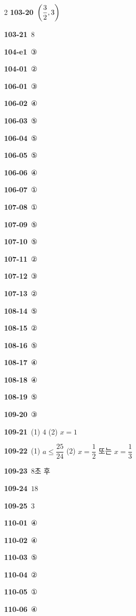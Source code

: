 \documentclass[10pt,a4paper]{article}
\begin{document}
\begin{multicols}{2}
\noindent\textbf{103-20}\ $\left(\dfrac{3}{2}{,}\mkern3mu 3\right)$\par
\noindent\textbf{103-21}\ $8$\par
\noindent\textbf{104-e1}\ ③\par
\noindent\textbf{104-01}\ ②\par
\noindent\textbf{106-01}\ ③\par
\noindent\textbf{106-02}\ ④\par
\noindent\textbf{106-03}\ ⑤\par
\noindent\textbf{106-04}\ ⑤\par
\noindent\textbf{106-05}\ ⑤\par
\noindent\textbf{106-06}\ ④\par
\noindent\textbf{106-07}\ ①\par
\noindent\textbf{107-08}\ ①\par
\noindent\textbf{107-09}\ ⑤\par
\noindent\textbf{107-10}\ ⑤\par
\noindent\textbf{107-11}\ ②\par
\noindent\textbf{107-12}\ ③\par
\noindent\textbf{107-13}\ ②\par
\noindent\textbf{108-14}\ ⑤\par
\noindent\textbf{108-15}\ ②\par
\noindent\textbf{108-16}\ ⑤\par
\noindent\textbf{108-17}\ ④\par
\noindent\textbf{108-18}\ ④\par
\noindent\textbf{108-19}\ ⑤\par
\noindent\textbf{109-20}\ ③\par
\noindent\textbf{109-21}\ (1) $4$ (2) $x=1$\par
\noindent\textbf{109-22}\ (1) $a\le\dfrac{25}{24}$ (2) $x=\dfrac{1}{2}$ 또는 $x=\dfrac{1}{3}$\par
\noindent\textbf{109-23}\ $8$초 후\par
\noindent\textbf{109-24}\ $18$\par
\noindent\textbf{109-25}\ $3$\par
\noindent\textbf{110-01}\ ④\par
\noindent\textbf{110-02}\ ④\par
\noindent\textbf{110-03}\ ⑤\par
\noindent\textbf{110-04}\ ②\par
\noindent\textbf{110-05}\ ①\par
\noindent\textbf{110-06}\ ④\par

\end{multicols}
\end{document}
